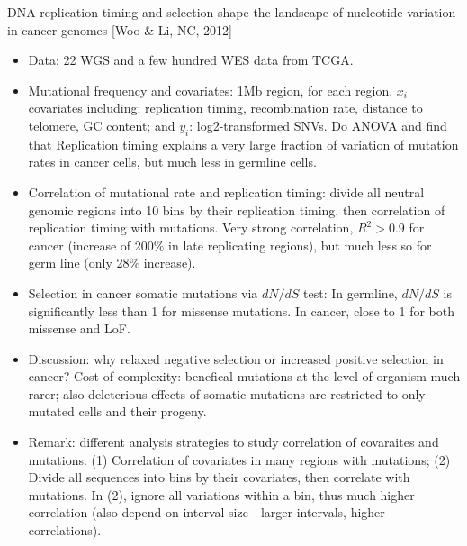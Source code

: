 \documentclass{report}
\begin{document}
DNA replication timing and selection shape the landscape of nucleotide variation in cancer genomes [Woo \& Li, NC, 2012]
\begin{itemize}
	\item Data: 22 WGS and a few hundred WES data from TCGA. 
	
	\item Mutational frequency and covariates: 1Mb region, for each region, $x_i$ covariates including: replication timing, recombination rate, distance to telomere, GC content; and $y_i$: log2-transformed SNVs. Do ANOVA and find that Replication timing explains a very large fraction of variation of mutation rates in cancer cells, but much less in germline cells. 
	
	\item Correlation of mutational rate and replication timing: divide all neutral genomic regions into 10 bins by their replication timing, then correlation of replication timing with mutations. Very strong correlation, $R^2 > 0.9$ for cancer (increase of 200\% in late replicating regions), but much less so for germ line (only 28\% increase). 
	
	\item Selection in cancer somatic mutations via $dN/dS$ test: In germline, $dN/dS$ is significantly less than 1 for missense mutations. In cancer, close to 1 for both missense and LoF.  
	
	\item Discussion: why relaxed negative selection or increased positive selection in cancer? Cost of complexity: benefical mutations at the level of organism much rarer; also deleterious effects of somatic mutations are restricted to only mutated cells and their progeny. 
	
	\item Remark: different analysis strategies to study correlation of covaraites and mutations. (1) Correlation of covariates in many regions with mutations; (2) Divide all sequences into bins by their covariates, then correlate with mutations. In (2), ignore all variations within a bin, thus much higher correlation (also depend on interval size - larger intervals, higher correlations). 
\end{itemize}
\end{document}
